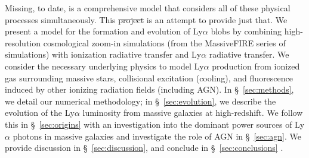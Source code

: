 Missing, to date, is a comprehensive model that considers all of these physical processes simultaneously.
This  \sout{project} is an attempt to provide just that.
We present a model for the formation and evolution of Ly$\alpha$ blobs by combining high-resolution cosmological zoom-in simulations (from the MassiveFIRE series of simulations) with ionization radiative transfer and Ly$\alpha$ radiative transfer.
We consider the necessary underlying physics to model Ly$\alpha$ production from ionized gas surrounding massive stars, collisional excitation (cooling), and fluorescence induced by other ionizing radiation fields (including AGN).
In \S~\ref{sec:methods}, we detail our numerical methodology; in \S~\ref{sec:evolution}, we describe the evolution of the Ly$\alpha$ luminosity from massive galaxies at high-redshift.
We follow this in \S~\ref{sec:origins} with an investigation into the dominant power sources of Ly$\alpha$ photons in massive galaxies and investigate the role of AGN in \S~\ref{sec:agn}.
We provide discussion in \S~\ref{sec:discussion}, and conclude in \S~\ref{sec:conclusions} .

